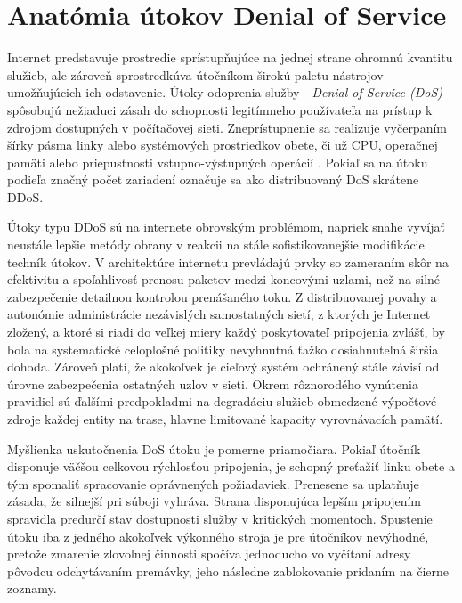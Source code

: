 \documentclass[12pt, a4paper]{article}
\begin{document}
\section{Anatómia útokov Denial of Service}
Internet predstavuje prostredie sprístupňujúce na jednej strane ohromnú kvantitu služieb, ale zároveň 
sprostredkúva útočníkom širokú paletu nástrojov umožňujúcich ich odstavenie. Útoky odoprenia služby
- \emph{Denial of Service (DoS)} - spôsobujú nežiaduci zásah do schopnosti legitímneho 
používateľa na prístup k zdrojom dostupných v počítačovej sieti. Zneprístupnenie sa realizuje vyčerpaním 
šírky pásma linky alebo systémových prostriedkov obete, či už CPU, operačnej pamäti alebo priepustnosti 
vstupno-výstupných operácií \cite{ddos-attacks}. Pokiaľ sa na útoku podieľa značný počet zariadení označuje 
sa ako distribuovaný DoS skrátene DDoS. 

Útoky typu DDoS sú na internete obrovským problémom, napriek snahe vyvíjať neustále lepšie 
metódy obrany v reakcii na stále sofistikovanejšie modifikácie techník útokov. V architektúre internetu 
prevládajú prvky so zameraním skôr na efektivitu a spoľahlivosť prenosu paketov medzi koncovými uzlami, než 
na silné zabezpečenie detailnou kontrolou prenášaného toku. Z distribuovanej povahy a autonómie 
administrácie nezávislých samostatných sietí, z ktorých je Internet zložený, a ktoré si riadi 
do veľkej miery každý poskytovateľ pripojenia zvlášť, by bola na systematické celoplošné politiky nevyhnutná 
ťažko dosiahnuteľná širšia dohoda. Zároveň platí, že akokoľvek je cieľový systém ochránený stále závisí od 
úrovne zabezpečenia ostatných uzlov v sieti. Okrem rôznorodého vynútenia pravidiel sú ďalšími predpokladmi 
na degradáciu služieb obmedzené výpočtové zdroje každej entity na trase, hlavne limitované kapacity 
vyrovnávacích pamätí.

Myšlienka uskutočnenia DoS útoku je pomerne priamočiara. Pokiaľ útočník disponuje väčšou celkovou rýchlosťou 
pripojenia, je schopný preťažiť linku obete a tým spomaliť spracovanie oprávnených požiadaviek. Prenesene sa 
uplatňuje zásada, že silnejší pri súboji vyhráva. Strana disponujúca lepším pripojením spravidla predurčí 
stav dostupnosti služby v kritických momentoch. Spustenie útoku iba z jedného akokoľvek výkonného stroja
je pre útočníkov nevýhodné, pretože zmarenie zlovoľnej činnosti spočíva jednoducho vo vyčítaní adresy 
pôvodcu odchytávaním premávky, jeho následne zablokovanie pridaním na čierne zoznamy. 
\end{document}
